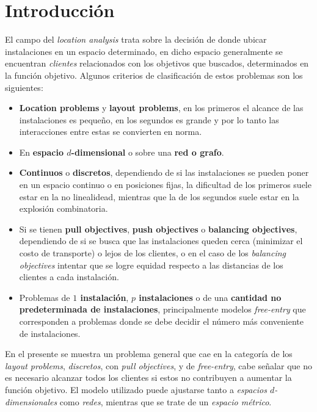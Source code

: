 \section{Introducción}

El campo del \emph{location analysis} trata sobre la decisión de donde ubicar instalaciones en un espacio determinado, en dicho espacio generalmente se encuentran \emph{clientes} relacionados con los objetivos que buscados, determinados en la función objetivo. Algunos criterios de clasificación de estos problemas son los siguientes\cite{revelle2005location}:

\begin{itemize}
\item \textbf{Location problems} y \textbf{layout problems}, en los primeros el alcance de las instalaciones es pequeño, en los segundos es grande y por lo tanto las interacciones entre estas se convierten en norma.
\item En \textbf{espacio $d$-dimensional} o sobre una \textbf{red o grafo}.
\item \textbf{Continuos} o \textbf{discretos}, dependiendo de si las instalaciones se pueden poner en un espacio continuo o en posiciones fijas, la dificultad de los primeros suele estar en la no linealidead, mientras que la de los segundos suele estar en la explosión combinatoria.
\item Si se tienen \textbf{pull objectives}, \textbf{push objectives} o \textbf{balancing objectives}, dependiendo de si se busca que las instalaciones queden cerca (minimizar el costo de transporte) o lejos de los clientes, o en el caso de los \emph{balancing objectives} intentar que se logre equidad respecto a las distancias de los clientes a cada instalación.
\item Problemas de \textbf{$1$ instalación}, \textbf{$p$ instalaciones} o de una \textbf{cantidad no predeterminada de instalaciones}, principalmente modelos \emph{free-entry} que corresponden a problemas donde se debe decidir el número más conveniente de instalaciones.
\end{itemize}


En el presente se muestra un problema general que cae en la categoría de los \emph{layout problems}, \emph{discretos}, con \emph{pull objectives}, y de \emph{free-entry}, cabe señalar que no es necesario alcanzar todos los clientes si estos no contribuyen a aumentar la función objetivo. El modelo utilizado puede ajustarse tanto a \emph{espacios $d$-dimensionales} como \emph{redes}, mientras que se trate de un \emph{espacio métrico}.

